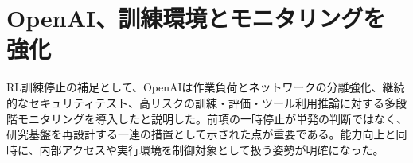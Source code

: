 \section{OpenAI、訓練環境とモニタリングを強化}
RL訓練停止の補足として、OpenAIは作業負荷とネットワークの分離強化、継続的なセキュリティテスト、高リスクの訓練・評価・ツール利用推論に対する多段階モニタリングを導入したと説明した。前項の一時停止が単発の判断ではなく、研究基盤を再設計する一連の措置として示された点が重要である。能力向上と同時に、内部アクセスや実行環境を制御対象として扱う姿勢が明確になった。
